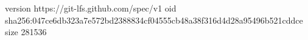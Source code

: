 version https://git-lfs.github.com/spec/v1
oid sha256:047ce6db323a7e572bd2388834cf04555cb48a38f316d4d28a95496b521cddce
size 281536

